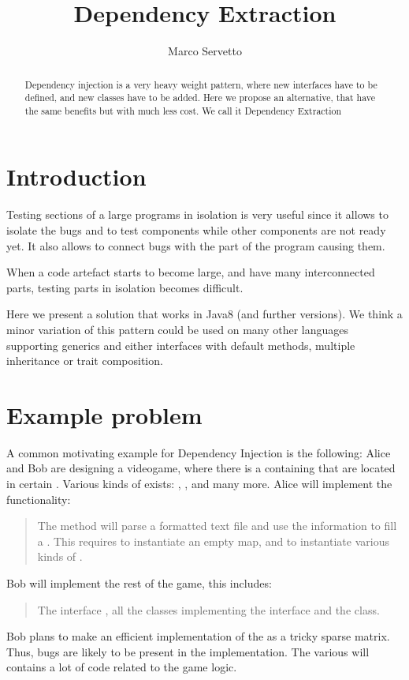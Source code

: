 \documentclass[submission,copyright,creativecommons]{eptcs}
\title{Dependency Extraction}
\author{Marco Servetto
\institute{ECS VUW\\ Wellington, New Zealand}
\institute{Engineering and Computer Science\\
Victoria University of Wellington}
\email{marco.servetto@ecs.vuw.ac.nz}
}
\begin{document}
\maketitle

\begin{abstract}
Dependency injection is a very heavy weight pattern,
where new interfaces have to be defined, and new classes
have to be added.
Here we propose an alternative, that have the same benefits
but with much less cost.
We call it Dependency Extraction
\end{abstract}

\section{Introduction}
Testing sections of a large programs in isolation is very useful since it
allows to isolate the bugs and to test components while other components 
are not ready yet.
It also allows to connect bugs with the part of the program causing them.

When a code artefact starts to become large, and have many 
interconnected parts, testing parts in isolation becomes difficult.

Here we present a solution that works in Java8 (and further versions).
We think a minor variation of this pattern could be used on many other languages supporting generics and
either interfaces with default methods, multiple inheritance or trait composition.

\section{Example problem}

A common motivating example for Dependency Injection is the following:
Alice and Bob are designing a videogame, where there
is a \Q@Map@ containing \Q@Item@s that are located in certain
\Q@Point@s.
Various kinds of \Q@Item@s exists: \Q@Wall@s, \Q@Rock@s,
\Q@Tree@s and many more.
Alice will implement the \Q@load@ functionality:
\begin{quote}
The \Q@load@ method will parse a formatted text file
and use the information to fill a \Q@Map@.
This requires to instantiate an empty map, and to instantiate various kinds of
\Q@Item@s.
\end{quote}
Bob will implement the rest of the game, this includes: 
\begin{quote}
The interface \Q@Item@,
all the classes implementing the \Q@Item@ interface
and the \Q@Map@ class.
\end{quote}
Bob plans to make an efficient implementation of the \Q@Map@ as a tricky
sparse matrix.
Thus, bugs are likely to be present in the \Q@Map@ implementation.
The various \Q@Item@s will contains a lot of code related to the game logic.
\end{document}
